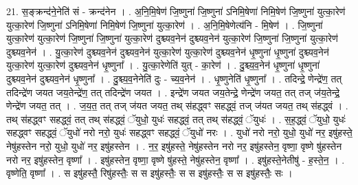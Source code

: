 \documentclass[17pt]{extarticle}
\begin{document}
21. स॒ङ्क्रन्द॑ने॒नेति॑ सं - क्रन्द॑नेन । . अ॒नि॒मि॒षेण॑ जि॒ष्णुना॑ जि॒ष्णुना॑ ऽनिमि॒षेणा॑ निमि॒षेण॑ जि॒ष्णुना॑ युत्का॒रेण॑ युत्का॒रेण॑ जि॒ष्णुना॑ ऽनिमि॒षेणा॑ निमि॒षेण॑ जि॒ष्णुना॑ युत्का॒रेण॑ । . अ॒नि॒मि॒षेणेत्य॑नि - मि॒षेण॑ । . जि॒ष्णुना॑ युत्का॒रेण॑ युत्का॒रेण॑ जि॒ष्णुना॑ जि॒ष्णुना॑ युत्का॒रेण॑ दुश्च्यव॒नेन॑ दुश्च्यव॒नेन॑ युत्का॒रेण॑ जि॒ष्णुना॑ जि॒ष्णुना॑ युत्का॒रेण॑ दुश्च्यव॒नेन॑ । . यु॒त्का॒रेण॑ दुश्च्यव॒नेन॑ दुश्च्यव॒नेन॑ युत्का॒रेण॑ युत्का॒रेण॑ दुश्च्यव॒नेन॑ धृ॒ष्णुना॑ धृ॒ष्णुना॑ दुश्च्यव॒नेन॑ युत्का॒रेण॑ युत्का॒रेण॑ दुश्च्यव॒नेन॑ धृ॒ष्णुना᳚ । . यु॒त्का॒रेणेति॑ युत् - का॒रेण॑ । . दु॒श्च्य॒व॒नेन॑ धृ॒ष्णुना॑ धृ॒ष्णुना॑ दुश्च्यव॒नेन॑ दुश्च्यव॒नेन॑ धृ॒ष्णुना᳚ । . दु॒श्च्य॒व॒नेनेति॑ दुः - च्य॒व॒नेन॑ । . धृ॒ष्णुनेति॑ धृ॒ष्णुना᳚ । . तदिन्द्रे॒ णेन्द्रे॑ण॒ तत् तदिन्द्रे॑ण जयत जय॒तेन्द्रे॑ण॒ तत् तदिन्द्रे॑ण जयत । . इन्द्रे॑ण जयत जय॒तेन्द्रे॒ णेन्द्रे॑ण जयत॒ तत् तज् ज॑य॒तेन्द्रे॒ णेन्द्रे॑ण जयत॒ तत् । . ज॒य॒त॒ तत् तज् ज॑यत जयत॒ तथ् स॑हद्ध्वꣳ सहद्ध्वं॒ तज् ज॑यत जयत॒ तथ् स॑हद्ध्वं । . तथ् स॑हद्ध्वꣳ सहद्ध्वं॒ तत् तथ् स॑हद्ध्वं॒ ॅयुधो॒ युधः॑ सहद्ध्वं॒ तत् तथ् स॑हद्ध्वं॒ ॅयुधः॑ । . स॒ह॒द्ध्वं॒ ॅयुधो॒ युधः॑ सहद्ध्वꣳ सहद्ध्वं॒ ॅयुधो॑ नरो नरो॒ युधः॑ 
सहद्ध्वꣳ सहद्ध्वं॒ ॅयुधो॑ नरः । . युधो॑ नरो नरो॒ युधो॒ युधो॑ नर॒ इषु॑हस्ते॒ नेषु॑हस्तेन नरो॒ युधो॒ युधो॑ नर॒ इषु॑हस्तेन । . न॒र॒ इषु॑हस्ते॒ नेषु॑हस्तेन नरो नर॒ इषु॑हस्तेन॒ वृष्णा॒ वृष्णे षु॑हस्तेन नरो नर॒ इषु॑हस्तेन॒ वृष्णा᳚ । . इषु॑हस्तेन॒ वृष्णा॒ वृष्णे षु॑हस्ते॒ नेषु॑हस्तेन॒ वृष्णा᳚ । . इषु॑हस्ते॒नेतीषु॑ - ह॒स्ते॒न॒ । . वृष्णेति॒ वृष्णा᳚ । . स इषु॑हस्तै॒ रिषु॑हस्तैः॒ स स इषु॑हस्तैः॒ स स इषु॑हस्तैः॒ स स इषु॑हस्तैः॒ सः । \newline
\end{document}
